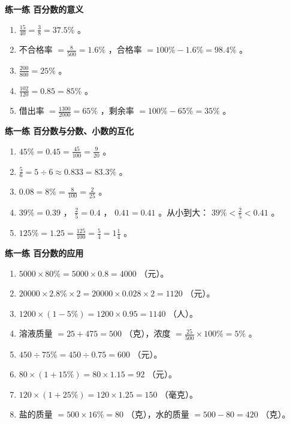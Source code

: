 \begin{answer}


\textbf{练一练 百分数的意义}

\begin{enumerate}
  \item $\frac{15}{40} = \frac{3}{8} = 37.5\%$ 。
  \item 不合格率 $= \frac{8}{500} = 1.6\%$ ，合格率 $= 100\% - 1.6\% = 98.4\%$ 。
  \item $\frac{200}{800} = 25\%$ 。
  \item $\frac{102}{120} = 0.85 = 85\%$ 。
  \item 借出率 $= \frac{1300}{2000} = 65\%$ ，剩余率 $= 100\% - 65\% = 35\%$ 。
\end{enumerate}


\textbf{练一练 百分数与分数、小数的互化}

\begin{enumerate}
  \item $45\% = 0.45 = \frac{45}{100} = \frac{9}{20}$ 。
  \item $\frac{5}{6} = 5 \div 6 \approx 0.833 = 83.3\%$ 。
  \item $0.08 = 8\% = \frac{8}{100} = \frac{2}{25}$ 。
  \item $39\% = 0.39$ ， $\frac{2}{5} = 0.4$ ， $0.41 = 0.41$ 。从小到大： $39\% < \frac{2}{5} < 0.41$ 。
  \item $125\% = 1.25 = \frac{125}{100} = \frac{5}{4} = 1\frac{1}{4}$ 。
\end{enumerate}


\textbf{练一练 百分数的应用}

\begin{enumerate}
  \item $5000 \times 80\% = 5000 \times 0.8 = 4000$ （元）。
  \item $20000 \times 2.8\% \times 2 = 20000 \times 0.028 \times 2 = 1120$ （元）。
  \item $1200 \times (1 - 5\%) = 1200 \times 0.95 = 1140$ （人）。
  \item 溶液质量 $= 25 + 475 = 500$ （克），浓度 $= \frac{25}{500} \times 100\% = 5\%$ 。
  \item $450 \div 75\% = 450 \div 0.75 = 600$ （元）。
  \item $80 \times (1 + 15\%) = 80 \times 1.15 = 92$ （元）。
  \item $120 \times (1 + 25\%) = 120 \times 1.25 = 150$ （毫克）。
  \item 盐的质量 $= 500 \times 16\% = 80$ （克），水的质量 $= 500 - 80 = 420$ （克）。
\end{enumerate}


\end{answer}
